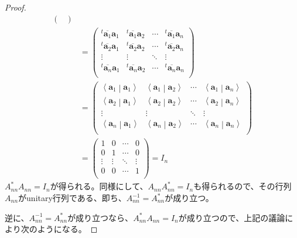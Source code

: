 \documentclass[dvipdfmx]{jsarticle}
\begin{document}
\begin{proof}
\begin{align*}
\begin{pmatrix}
\end{pmatrix}\\
&= \begin{pmatrix}
^{t}\overline{\mathbf{a}_{1}}\mathbf{a}_{1} &^{t}\overline{\mathbf{a}_{1}}\mathbf{a}_{2} & \cdots &^{t}\overline{\mathbf{a}_{1}}\mathbf{a}_{n} \\
^{t}\overline{\mathbf{a}_{2}}\mathbf{a}_{1} &^{t}\overline{\mathbf{a}_{2}}\mathbf{a}_{2} & \cdots &^{t}\overline{\mathbf{a}_{2}}\mathbf{a}_{n} \\
 \vdots & \vdots & \ddots & \vdots \\
^{t}\overline{\mathbf{a}_{n}}\mathbf{a}_{1} &^{t}\overline{\mathbf{a}_{n}}\mathbf{a}_{2} & \cdots &^{t}\overline{\mathbf{a}_{n}}\mathbf{a}_{n} \\
\end{pmatrix}\\
&= \begin{pmatrix}
\left\langle \mathbf{a}_{1} \middle| \mathbf{a}_{1} \right\rangle & \left\langle \mathbf{a}_{1} \middle| \mathbf{a}_{2} \right\rangle & \cdots & \left\langle \mathbf{a}_{1} \middle| \mathbf{a}_{n} \right\rangle \\
\left\langle \mathbf{a}_{2} \middle| \mathbf{a}_{1} \right\rangle & \left\langle \mathbf{a}_{2} \middle| \mathbf{a}_{2} \right\rangle & \cdots & \left\langle \mathbf{a}_{2} \middle| \mathbf{a}_{n} \right\rangle \\
 \vdots & \vdots & \ddots & \vdots \\
\left\langle \mathbf{a}_{n} \middle| \mathbf{a}_{1} \right\rangle & \left\langle \mathbf{a}_{n} \middle| \mathbf{a}_{2} \right\rangle & \cdots & \left\langle \mathbf{a}_{n} \middle| \mathbf{a}_{n} \right\rangle \\
\end{pmatrix}\\
&= \begin{pmatrix}
1 & 0 & \cdots & 0 \\
0 & 1 & \cdots & 0 \\
 \vdots & \vdots & \ddots & \vdots \\
0 & 0 & \cdots & 1 \\
\end{pmatrix} = I_{n}
\end{align*}
$A_{nn}^{*}A_{nn} = I_{n}$が得られる。同様にして、$A_{nn}A_{nn}^{*} = I_{n}$も得られるので、その行列$A_{nn}$がunitary行列である、即ち、$A_{nn}^{- 1} = A_{nn}^{*}$が成り立つ。\par
逆に、$A_{nn}^{- 1} = A_{nn}^{*}$が成り立つなら、$A_{nn}^{*}A_{nn} = I_{n}$が成り立つので、上記の議論により次のようになる。

\end{proof}
\end{document}
